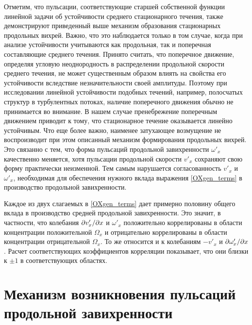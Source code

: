Отметим, что пульсации, соответствующие старшей собственной функции линейной задачи об устойчивости среднего стационарного течения, также демонстрируют приведенный выше механизм образования стационарных продольных вихрей. Важно, что это наблюдается только в том случае, когда при анализе устойчивости учитываются как продольная, так и поперечная составляющие среднего течения. Принято считать, что поперечное движение, определяя угловую неоднородность в распределении продольной скорости среднего течения, не может существенным образом влиять на свойства его устойчивости вследствие незначительности своей амплитуды. Поэтому при исследовании линейной устойчивости подобных течений, например, полосчатых структур в турбулентных потоках, наличие поперечного движения обычно не принимается во внимание. В нашем случае пренебрежение поперечным движением приводит к тому, что стационарное течение оказывается линейно устойчивым. Что еще более важно, наименее затухающее возмущение не воспроизводит при этом описанный механизм формирования продольных вихрей. Это связанно с тем, что форма пульсаций продольной завихренности $\omega'_x$ качественно меняется, хотя пульсации продольной скорости $v'_x$ сохраняют свою форму практически неизменной. Тем самым нарушается согласованность  $v'_x$ и $\omega'_x$, необходимая для обеспечения нужного вклада выражения \eqref{OXgen_terms} в производство продольной завихренности.

Каждое из двух слагаемых в \eqref{OXgen_terms} дает примерно половину общего вклада в производство средней продольной завихренности. Это значит, в частности, что колебания $\partial v'_x/\partial x$ и $\omega'_x$ положительно коррелированы в области концентрации положительной $\Omega_x$ и отрицательно коррелированы в области концентрации отрицательной $\Omega_x$. То же относится и к колебаниям $-v'_x$ и $\partial \omega'_x/\partial x$. Расчет соответствующих коэффициентов корреляции показывает, что они близки к $\pm1$ в соответствующих областях. 


\section{Механизм возникновения пульсаций продольной завихренности}

